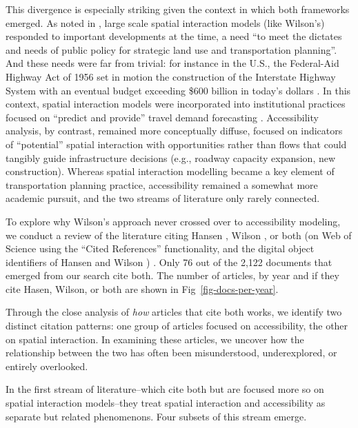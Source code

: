 \documentclass[
  10pt,
  letterpaper,
]{article}
\begin{document}
This divergence is especially striking given the context in which both
frameworks emerged. As noted in
\citep{battyChronicleScientificPlanning1994}, large scale spatial
interaction models (like Wilson's) responded to important developments
at the time, a need ``to meet the dictates and needs of public policy
for strategic land use and transportation planning''. And these needs
were far from trivial: for instance in the U.S., the Federal-Aid Highway
Act of 1956 set in motion the construction of the Interstate Highway
System with an eventual budget exceeding \$600 billion in today's
dollars
\citep{weinerUrbanTransportationPlanning2016, mdotMnDOTJoins2007}. In
this context, spatial interaction models were incorporated into
institutional practices focused on ``predict and provide'' travel demand
forecasting
\citep{kovatch1971modeling, weinerUrbanTransportationPlanning2016}.
Accessibility analysis, by contrast, remained more conceptually diffuse,
focused on indicators of ``potential'' spatial interaction with
opportunities rather than flows that could tangibly guide infrastructure
decisions (e.g., roadway capacity expansion, new construction). Whereas
spatial interaction modelling became a key element of transportation
planning practice, accessibility remained a somewhat more academic
pursuit, and the two streams of literature only rarely connected.

To explore why Wilson's approach never crossed over to accessibility
modeling, we conduct a review of the literature citing Hansen
\citep{hansen1959}, Wilson \citep{wilson1971}, or both (on Web of
Science using the ``Cited References'' functionality, and the digital
object identifiers of Hansen \citep{hansen1959} and Wilson
\citep{wilson1971}) . Only 76 out of the 2,122 documents that emerged
from our search cite both. The number of articles, by year and if they
cite Hasen, Wilson, or both are shown in Fig~\ref{fig-docs-per-year}.

Through the close analysis of \emph{how} articles that cite both works,
we identify two distinct citation patterns: one group of articles
focused on accessibility, the other on spatial interaction. In examining
these articles, we uncover how the relationship between the two has
often been misunderstood, underexplored, or entirely overlooked.

In the first stream of literature--which cite both but are focused more
so on spatial interaction models--they treat spatial interaction and
accessibility as separate but related phenomenons. Four subsets of this
stream emerge.
\end{document}
